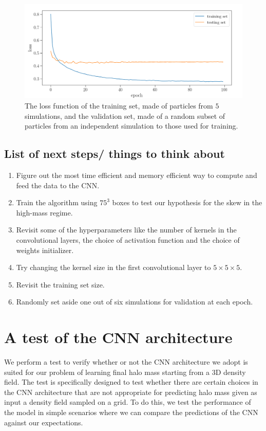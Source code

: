 \documentclass[11pt]{article}
\begin{document}
\begin{figure}[t]
\centering
\includegraphics[width=0.85\columnwidth]{loss.png}
\caption{The loss function of the training set, made of particles from $5$ simulations, and the validation set, made of a random subset of particles from an independent simulation to those used for training.}
\label{fig:loss}
\end{figure}

\subsection{List of next steps/ things to think about}
\begin{enumerate}
\item Figure out the most time efficient and memory efficient way to compute and feed the data to the CNN.
\item Train the algorithm using $75^3$ boxes to test our hypothesis for the skew in the high-mass regime.
\item Revisit some of the hyperparameters like the number of kernels in the convolutional layers, the choice of activation function and the choice of weights initializer.
\item Try changing the kernel size in the first convolutional layer to $5\times5\times5$.
\item Revisit the training set size.
\item Randomly set aside one out of six simulations for validation at each epoch.
\end{enumerate}


\section{A test of the CNN architecture}

We perform a test to verify whether or not the CNN architecture we adopt is suited for our problem of learning final halo mass starting from a 3D density field. The test is specifically designed to test whether there are certain choices in the CNN architecture that are not appropriate for predicting halo mass given as input a density field sampled on a grid. To do this, we test the performance of the model in simple scenarios where we can compare the predictions of the CNN against our expectations.
\end{document}
